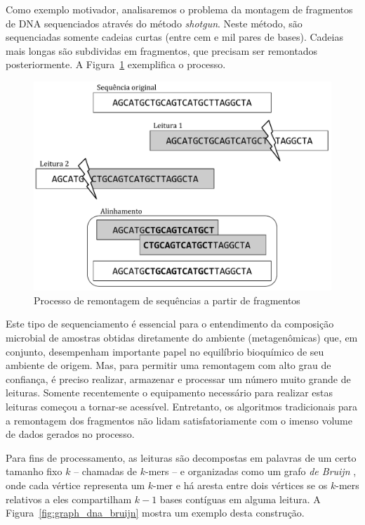 Como exemplo motivador, analisaremos o problema da montagem de fragmentos de DNA sequenciados através do método \emph{shotgun}. Neste método, são sequenciadas somente cadeias curtas (entre cem e mil pares de bases). Cadeias mais longas são subdividas em fragmentos, que precisam ser remontados posteriormente. A Figura~\ref{fig:graph_dna_assembly} exemplifica o processo.

\begin{figure}[!htbp]
  \centering
  \includegraphics[scale=0.6]{figures/graph_dna_assembly.pdf}
  \caption{Processo de remontagem de sequências a partir de fragmentos}
  \label{fig:graph_dna_assembly}
\end{figure}

Este tipo de sequenciamento é essencial para o entendimento da composição microbial de amostras obtidas diretamente do ambiente (metagenômicas) que, em conjunto, desempenham importante papel no equilíbrio bioquímico de seu ambiente de origem. Mas, para permitir uma remontagem com alto grau de confiança, é preciso realizar, armazenar e processar um número muito grande de leituras. Somente recentemente o equipamento necessário para realizar estas leituras começou a tornar-se acessível. Entretanto, os algoritmos tradicionais para a remontagem dos fragmentos não lidam satisfatoriamente com o imenso volume de dados gerados no processo.

Para fins de processamento, as leituras são decompostas em palavras de um certo tamanho fixo $k$ -- chamadas de $k$-mers -- e organizadas como um grafo \emph{de Bruijn} \cite{pevzner2001eulerian,compeau2011apply}, onde cada vértice representa um $k$-mer e há aresta entre dois vértices se os $k$-mers relativos a eles compartilham $k-1$ bases contíguas em alguma leitura. A Figura~\ref{fig:graph_dna_bruijn} mostra um exemplo desta construção. 

